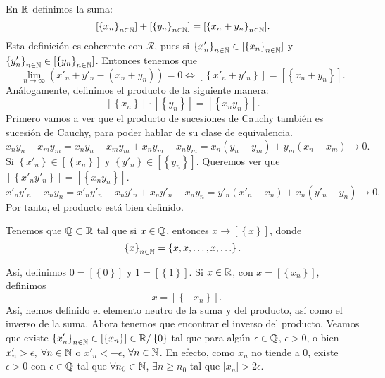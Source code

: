En $\displaystyle \mathbb{R} $ definimos la suma:
\[[ \left\{ x_{n}\right\} _{n\in\mathbb{N}}] + [ \left\{ y_{n}\right\} _{n\in\mathbb{N}}] = [ \left\{ x_{n}+y_{n}\right\} _{n\in\mathbb{N}}].\]
Esta definición es coherente con $\displaystyle \mathcal{R} $, pues si $\displaystyle \left\{ x'_{n}\right\} _{n\in\mathbb{N}} \in [ \left\{ x_{n}\right\} _{n\in\mathbb{N}}] $ y $\displaystyle \left\{ y'_{n}\right\} _{n\in\mathbb{N}}\in[ \left\{ y_{n}\right\} _{n\in\mathbb{N}}]  $. Entonces tenemos que
\[\lim_{n \to \infty}\left(x'_{n}+y'_{n} - \left(x_{n}+y_{n}\right)\right) = 0  \iff [ \left\{ x'_{n}+y'_{n}\right\}] = [ \left\{ x_{n}+y_{n}\right\}]   .\]
Análogamente, definimos el producto de la siguiente manera:
\[[ \left\{ x_{n}\right\}] \cdot [ \left\{ y_{n}\right\}] = [ \left\{ x_{n} y_{n}\right\}]  .\]
Primero vamos a ver que el producto de sucesiones de Cauchy también es sucesión de Cauchy, para poder hablar de su clase de equivalencia.
\[x_{n}y_{n}-x_{m}y_{m} = x_{n}y_{n}-x_{m}y_{m} + x_{n}y_{m}-x_{n}y_{m} = x_{n}\left(y_{n}-y_{m}\right)+y_{m}\left(x_{n}-x_{m}\right) \to 0 .\]
Si $\displaystyle \left\{ x'_{n}\right\} \in [ \left\{ x_{n}\right\}]  $ y $\displaystyle \left\{ y'_{n}\right\} \in [ \left\{ y_{n}\right\}]  $. Queremos ver que $\displaystyle [ \left\{ x'_{n}y'_{n}\right\}]= [ \left\{ x_{n}y_{n}\right\}]  $. 
\[x'_{n}y'_{n}-x_{n}y_{n} = x'_{n}y'_{n} - x_{n}y'_{n} + x_{n}y'_{n} - x_{n}y_{n} = y'_{n}\left(x'_{n}-x_{n}\right)+x_{n}\left(y'_{n}-y_{n}\right) \to 0 .\]
Por tanto, el producto está bien definido. 
\begin{fdefinition}[]
\normalfont Tenemos que $\displaystyle \mathbb{Q}\subset\mathbb{R} $ tal que si $\displaystyle x \in \mathbb{Q} $, entonces  $\displaystyle x \to [ \left\{ x\right\}]  $, donde 
\[ \left\{ x\right\} _{n\in\mathbb{N}} = \left\{ x, x, \ldots, x, \ldots\right\}  .\]
\end{fdefinition}
Así, definimos $\displaystyle 0 = [ \left\{0\right\}]  $ y $\displaystyle 1 = [ \left\{1\right\}]  $. Si $\displaystyle x \in \mathbb{R} $, con $\displaystyle x = [ \left\{ x_{n}\right\}]  $, definimos 
\[-x= [ \left\{- x_{n}\right\}]  .\]
Así, hemos definido el elemento neutro de la suma y del producto, así como el inverso de la suma. Ahora tenemos que encontrar el inverso del producto. Veamos que existe $\displaystyle \left\{ x'_{n}\right\} _{n\in\mathbb{N}} \in [ \left\{ x_{n}\right\}] \in \mathbb{R}/ \left\{ 0\right\}  $ tal que para algún $\displaystyle \epsilon \in \mathbb{Q} $, $\displaystyle \epsilon > 0 $, o bien $\displaystyle x'_{n} > \epsilon, \; \forall n \in \mathbb{N} $ o $\displaystyle x'_{n} < - \epsilon  $, $\displaystyle \forall n \in \mathbb{N} $. En efecto, como $\displaystyle x_{n} $ no tiende a $\displaystyle 0 $, existe $\displaystyle \epsilon > 0 $ con $\displaystyle \epsilon \in \mathbb{Q} $ tal que $\displaystyle \forall n_{0} \in \mathbb{N} $, $\displaystyle \exists n\geq n_{0} $ tal que $\displaystyle \left|x_{n}\right|>2\epsilon  $.
